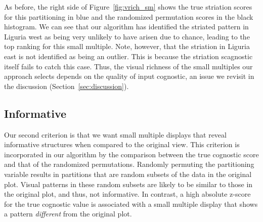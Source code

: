 As before, the right side of Figure~\ref{fig:vrich_sm} shows the true striation scores for this partitioning in blue and the randomized permutation scores in the black histogram. We can see that our algorithm has identified the striated pattern in Liguria west as being very unlikely to have arisen due to chance, leading to the top ranking for this small multiple. 
Note, however, that the striation in Liguria east is not identified as being an outlier. This is because the striation scagnostic itself fails to catch this case. Thus, the visual richness of the small multiples our approach selects depends on the quality of input cognostic, an issue we revisit in the discussion (Section~\ref{sec:discussion}).

\subsection{Informative}
Our second criterion is that we want small multiple displays that reveal informative structures when compared to the original view. This criterion is incorporated in our algorithm by the comparison between the true cognostic score and that of the randomized permutations. Randomly permuting the partitioning variable results in partitions that are random subsets of the data in the original plot. Visual patterns in these random subsets are likely to be similar to those in the original plot, and thus, not informative. In contrast, a high absolute z-score for the true cognostic value is associated with a small multiple display that shows a pattern \emph{different} from the original plot.

